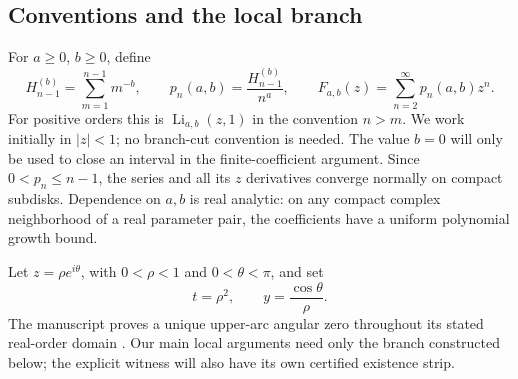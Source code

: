\documentclass[11pt,a4paper]{article}
\theoremstyle{definition}\newtheorem{definition}[theorem]{Definition}
\theoremstyle{remark}\newtheorem{remark}[theorem]{Remark}
\newcommand{\rbLi}{\operatorname{Li}}
\numberwithin{equation}{section}
\begin{document}
\subsection{Conventions and the local branch}
For $a\ge0$, $b\ge0$, define
\begin{equation}
 H_{n-1}^{(b)}=\sum_{m=1}^{n-1}m^{-b},\qquad
 p_n(a,b)=\frac{H_{n-1}^{(b)}}{n^a},\qquad
 F_{a,b}(z)=\sum_{n=2}^{\infty}p_n(a,b)z^n.
 \label{rbif:eq:def}
\end{equation}
For positive orders this is $\rbLi_{a,b}(z,1)$ in the convention
$n>m$. We work initially in $|z|<1$; no branch-cut convention is needed.
The value $b=0$ will only be used to close an interval in the
finite-coefficient argument. Since $0<p_n\le n-1$, the series and all
its $z$ derivatives converge normally on compact subdisks. Dependence on
$a,b$ is real analytic: on any compact complex neighborhood of a real
parameter pair, the coefficients have a uniform polynomial growth bound.

Let $z=\rho e^{i\theta}$, with $0<\rho<1$ and $0<\theta<\pi$, and set
\begin{equation}
 t=\rho^2,\qquad y=\frac{\cos\theta}{\rho}.
 \label{rbif:eq:ty}
\end{equation}
The manuscript proves a unique upper-arc angular zero throughout its
stated real-order domain \cite{rbif:cartesian}. Our main local arguments
need only the branch constructed below; the explicit witness will also
have its own certified existence strip.
\end{document}
